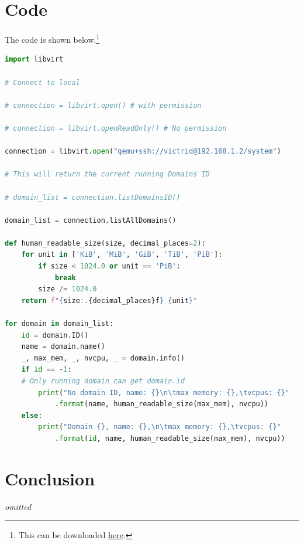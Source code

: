 \documentclass[12pt]{article}
\begin{document}
\newpage

\section{Code}

The code is shown below.\footnote{This can be downloaded  \textcolor{blue}{\href{https://gist.github.com/Victrid/c7cb3ee702c6c32d31f7c1915c7cd972}{here}}.}

\begin{lstlisting}[language=python]
import libvirt

# Connect to local

# connection = libvirt.open() # with permission

# connection = libvirt.openReadOnly() # No permission

connection = libvirt.open("qemu+ssh://victrid@192.168.1.2/system")

# This will return the current running Domains ID

# domain_list = connection.listDomainsID()

domain_list = connection.listAllDomains()

def human_readable_size(size, decimal_places=2):
    for unit in ['KiB', 'MiB', 'GiB', 'TiB', 'PiB']:
        if size < 1024.0 or unit == 'PiB':
            break
        size /= 1024.0
    return f"{size:.{decimal_places}f} {unit}"

for domain in domain_list:
    id = domain.ID()
    name = domain.name()
    _, max_mem, _, nvcpu, _ = domain.info()
    if id == -1:
    # Only running domain can get domain.id
        print("No domain ID, name: {}\n\tmax memory: {},\tvcpus: {}"
            .format(name, human_readable_size(max_mem), nvcpu))
    else:
        print("Domain {}, name: {},\n\tmax memory: {},\tvcpus: {}"
            .format(id, name, human_readable_size(max_mem), nvcpu))
\end{lstlisting}

\section{Conclusion}

\emph{omitted}
\end{document}
